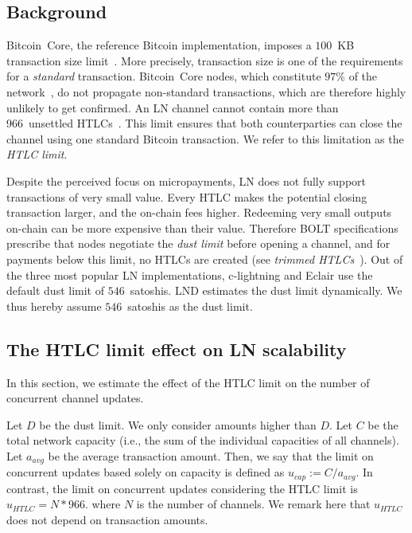 \subsection{Background} \label{max-htlc-background}

Bitcoin~Core, the reference Bitcoin implementation, imposes a $100$~KB transaction size limit~\cite{StandardTxBitcoinSE, BitcoinCoreMaxTxWeight}.
More precisely, transaction size is one of the requirements for a \textit{standard} transaction.
Bitcoin~Core nodes, which constitute $97\%$ of the network~\cite{CoinDance}, do not propagate non-standard transactions, which are therefore highly unlikely to get confirmed.
An LN channel cannot contain more than 966~unsettled HTLCs~\cite{BOLT2Rationale}.
This limit ensures that both counterparties can close the channel using one standard Bitcoin transaction.
We refer to this limitation as the \textit{HTLC limit}.

Despite the perceived focus on micropayments, LN does not fully support transactions of very small value.
Every HTLC makes the potential closing transaction larger, and the on-chain fees higher.
Redeeming very small outputs on-chain can be more expensive than their value.
Therefore BOLT specifications prescribe that nodes negotiate the \textit{dust limit} before opening a channel, and for payments below this limit, no HTLCs are created (see \textit{trimmed HTLCs}~\cite{BOLT3Trimmed}).
Out of the three most popular LN implementations, c-lightning and Eclair use the default dust limit of $546$~satoshis.
LND estimates the dust limit dynamically.
We thus hereby assume $546$~satoshis as the dust limit.


\subsection{The HTLC limit effect on LN scalability}	\label{estimating-concurrent channel updates}

In this section, we estimate the effect of the HTLC limit on the number of concurrent channel updates.

Let $D$ be the dust limit.
We only consider amounts higher than $D$.
Let $C$ be the total network capacity (i.e., the sum of the individual capacities of all channels).
Let $a_\textit{avg}$ be the average transaction amount. 
Then, we say that the limit on concurrent updates based solely on capacity is defined as   
$u_\textit{cap} := C / a_\textit{avg}$.
In contrast, the limit on concurrent updates 
considering the HTLC limit is $u_\textit{HTLC} = N * 966$.
where $N$ is the number of channels. We remark here that $u_\textit{HTLC}$ does not depend on transaction amounts.

